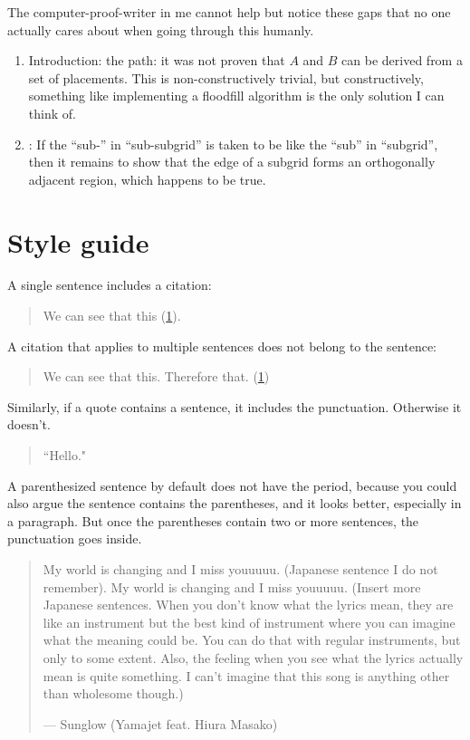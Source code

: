 \documentclass{article}
\theoremstyle{definition}%
\begin{document}
The computer-proof-writer in me cannot help but notice these gaps that no one actually cares about when going through this humanly.

\begin{enumerate}
\item Introduction: the path: it was not proven that $A$ and $B$ can be derived from a set of placements. This is non-constructively trivial, but constructively, something like implementing a floodfill algorithm is the only solution I can think of.

\item {}: If the ``sub-'' in ``sub-subgrid''  is taken to be like the ``sub'' in ``subgrid'', then it remains to show that the edge of a subgrid forms an orthogonally adjacent region, which happens to be true.
\end{enumerate}

\section{Style guide}\label{sec:style}

A single sentence includes a citation:

\begin{quote}
We can see that this (\cref{sec:style}).
\end{quote}

A citation that applies to multiple sentences does not belong to the sentence:

\begin{quote}
We can see that this. Therefore that. (\cref{sec:style})
\end{quote}

Similarly, if a quote contains a sentence, it includes the punctuation. Otherwise it doesn't.
\begin{quote}
``Hello."
\end{quote}

A parenthesized sentence by default does not have the period, because you could also argue the sentence contains the parentheses, and it looks better, especially in a paragraph. But once the parentheses contain two or more sentences, the punctuation goes inside.
\begin{quotation}
My world is changing and I miss youuuuu.
(Japanese sentence I do not remember).
My world is changing and I miss youuuuu.
(Insert more Japanese sentences. When you don't know what the lyrics mean, they are like an instrument but the best kind of instrument where you can imagine what the meaning could be. You can do that with regular instruments, but only to some extent. Also, the feeling when you see what the lyrics actually mean is quite something. I can't imagine that this song is anything other than wholesome though.)

--- Sunglow (Yamajet feat. Hiura Masako)
\end{quotation}
\end{document}

